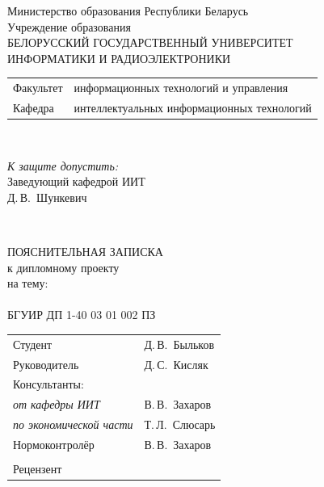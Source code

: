 \begin{titlepage}
  \begin{center}
    Министерство образования Республики Беларусь\\[1em]
    Учреждение образования\\
    БЕЛОРУССКИЙ ГОСУДАРСТВЕННЫЙ УНИВЕРСИТЕТ \\
    ИНФОРМАТИКИ И РАДИОЭЛЕКТРОНИКИ\\[1em]

    \begin{minipage}{\textwidth}
      \begin{flushleft}
        \begin{tabular}{ l l }
          Факультет & информационных технологий и управления\\
          Кафедра   & интеллектуальных информационных технологий
        \end{tabular}
      \end{flushleft}
    \end{minipage}\\[1em]

    \begin{flushright}
      \begin{minipage}{0.4\textwidth}
        \textit{К защите допустить:}\\[0.8em]
        Заведующий кафедрой ИИТ\\[0.45em]
        \underline{\hspace*{2.8cm}} Д.\,В.~Шункевич
      \end{minipage}\\[2.2em]
    \end{flushright}

    {ПОЯСНИТЕЛЬНАЯ ЗАПИСКА}\\
    {к дипломному проекту}\\
    {на тему:}\\[1em]
    \textbf{\large \MakeUppercase{\topicName}}\\[1em]


    {БГУИР ДП 1-40 03 01 002 ПЗ}\\[2em]
    
    \begin{tabular}{ p{}p{} }
      Студент & Д.\,В.~Быльков \\
      Руководитель & Д.\,С.~Кисляк \\
      Консультанты: &\\
      \hspace*{3ex}\emph{от кафедры ИИТ} & В.\,В.~Захаров \\
      \hspace*{3ex}\emph{по экономической части} & Т.\,Л.~Слюсарь \\
      Нормоконтролёр & В.\,В.~Захаров\\
      & \\
      Рецензент &
    \end{tabular}
    

\end{center}
\end{titlepage}
